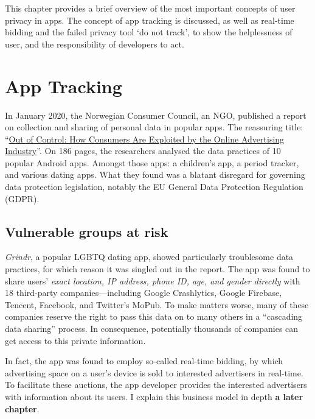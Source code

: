 \documentclass[
]{book}
\begin{document}
This chapter provides a brief overview of the most important concepts of user privacy in apps. The concept of app tracking is discussed, as well as real-time bidding and the failed privacy tool `do not track', to show the helplessness of user, and the responsibility of developers to act.

\hypertarget{app-tracking}{%
\section{App Tracking}\label{app-tracking}}

In January 2020, the Norwegian Consumer Council, an NGO, published a report on collection and sharing of personal data in popular apps. The reassuring title: ``\href{https://fil.forbrukerradet.no/wp-content/uploads/2020/01/2020-01-14-out-of-control-final-version.pdf}{Out of Control: How Consumers Are Exploited by the Online Advertising Industry}''. On 186 pages, the researchers analysed the data practices of 10 popular Android apps. Amongst those apps: a children's app, a period tracker, and various dating apps. What they found was a blatant disregard for governing data protection legislation, notably the EU General Data Protection Regulation (GDPR).

\hypertarget{vulnerable-groups-at-risk}{%
\subsection{Vulnerable groups at risk}\label{vulnerable-groups-at-risk}}

\emph{Grindr}, a popular LGBTQ dating app, showed particularly troublesome data practices, for which reason it was singled out in the report. The app was found to share users' \emph{exact location, IP address, phone ID, age, and gender directly} with 18 third-party companies---including Google Crashlytics, Google Firebase, Tencent, Facebook, and Twitter's MoPub. To make matters worse, many of these companies reserve the right to pass this data on to many others in a ``cascading data sharing'' process. In consequence, potentially thousands of companies can get access to this private information.

In fact, the app was found to employ so-called real-time bidding, by which advertising space on a user's device is sold to interested advertisers in real-time. To facilitate these auctions, the app developer provides the interested advertisers with information about its users. I explain this business model in depth \textbf{a later chapter}.
\end{document}
